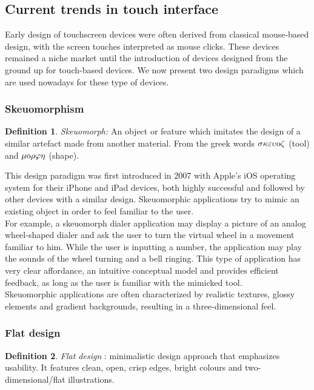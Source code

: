 \documentclass[a4paper,11pt] {article}
\theoremstyle{definition}
\newtheorem{defn}{Definition}[section]
\begin{document}
    \subsection{Current trends in touch interface}

    Early design of touchscreen devices were often derived from classical mouse-based design, with the screen touches interpreted as mouse clicks. These devices remained a niche market until the introduction of devices designed from the ground up for touch-based devices. We now present two design paradigms which are used nowadays for these type of devices.

        \subsubsection{Skeuomorphism}
        \begin{defn}
        \textit{Skeuomorph:} An object or feature which imitates the design of a similar artefact made from another material. From the greek words $\sigma \kappa \varepsilon \upsilon {\rm o} \zeta$ (tool) and $\mu {\rm o} \rho \varphi \eta$ (shape).
        \end{defn}

        This design paradigm was first introduced in 2007 with Apple's iOS operating system for their iPhone and iPad devices, both highly successful and followed by other devices with a similar design. Skeuomorphic applications try to mimic an existing object in order to feel familiar to the user.\\

        For example, a skeuomorph dialer application may display a picture of an analog wheel-shaped dialer and ask the user to turn the virtual wheel in a movement familiar to him. While the user is inputting a number, the application may play the sounds of the wheel turning and a bell ringing. This type of application has very clear affordance, an intuitive conceptual model and provides efficient feedback, as long as the user is familiar with the mimicked tool.\\

        Skeuomorphic applications are often characterized by realistic textures, glossy elements and gradient backgrounds, resulting in a three-dimensional feel.

        \subsubsection{Flat design}
        \begin{defn}
        \textit{Flat design} \cite{whatIsFlat}: minimalistic design approach that emphasizes usability. It features clean, open, crisp edges, bright colours and two-dimensional/flat illustrations.
        \end{defn}
\end{document}
